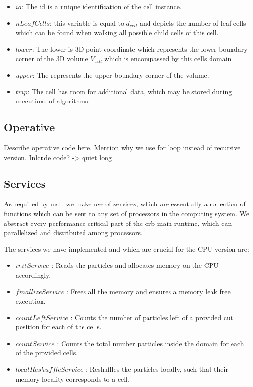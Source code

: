 \documentclass[]{article}
\begin{document}
\begin{itemize}
	\item $id$: The id is a unique identification of the cell instance.
	\item $nLeafCells$: this variable is equal to $d_{cell}$ and depicts the number of leaf cells which can be found when walking all possible child cells of this cell. 
	\item $lower$: The lower is 3D point coordinate which represents the lower boundary corner of the 3D volume $V_{cell}$ which is encompassed by this cells domain.
	\item $upper$: The represents the upper boundary corner of the volume.	
	\item $tmp$: The cell has room for additional data, which may be stored during executions of algorithms. 
\end{itemize}

\subsection{Operative}

Describe operative code here. Mention why we use for loop instead of recursive version. Inlcude code? -> quiet long

\subsection{Services}

As required by mdl, we make use of services, which are essentially a collection of functions which can be sent to any set of processors in the computing system. We abstract every performance critical part of the orb main runtime, which can parallelized and distributed among processors.

The services we have implemented and which are crucial for the CPU version are:

\begin{itemize}
	\item $initService$ : Reads the particles and allocates memory on the CPU accordingly.
	\item $finallizeService$ : Frees all the memory and ensures a memory leak free execution.  
	\item $countLeftService$ : Counts the number of particles left of a provided cut position for each of the cells.
	\item $countService$ : Counts the total number particles inside the domain for each of the provided cells.
	\item $localReshuffleService$ : Reshuffles the particles locally, such that their memory locality corresponds to a cell. 
\end{itemize}
\end{document}
